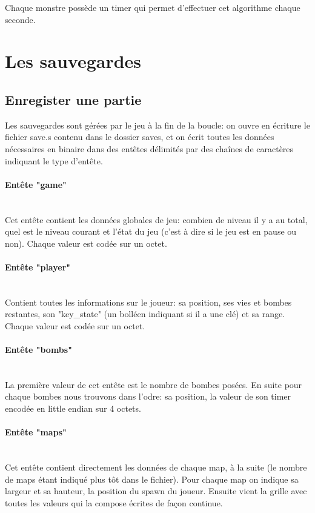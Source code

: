 \documentclass[12pt,a4paper]{article} %
\begin{document}
Chaque monstre possède un timer qui permet d'effectuer cet algorithme chaque seconde.

\section{Les sauvegardes}


\subsection{Enregister une partie}

Les sauvegardes sont gérées par le jeu à la fin de la boucle: on ouvre en écriture le fichier save.s contenu dans le dossier saves, et 
on écrit toutes les données nécessaires en binaire dans des entêtes délimités par des chaînes de caractères indiquant le type d'entête.

\paragraph{Entête "game"} \hspace{0pt} \\
Cet entête contient les données globales de jeu: combien de niveau il y a au total, quel est le niveau courant et l'état du jeu (c'est à dire si le jeu est en pause ou non). Chaque valeur est codée sur un octet.

\paragraph{Entête "player"} \hspace{0pt} \\
Contient toutes les informations sur le joueur: sa position, ses vies et bombes restantes, son "key\_state" (un bolléen indiquant si il a une clé) et sa range. Chaque valeur est codée sur un octet.

\paragraph{Entête "bombs"} \hspace{0pt} \\
La première valeur de cet entête est le nombre de bombes posées. En suite pour chaque bombes nous trouvons dans l'odre: sa position, la valeur de son timer encodée en little endian sur 4 octets.

\paragraph{Entête "maps"} \hspace{0pt} \\
Cet entête contient directement les données de chaque map, à la suite (le nombre de maps étant indiqué plus tôt dans le fichier). 
Pour chaque map on indique sa largeur et sa hauteur, la position du spawn du joueur. Ensuite vient la grille avec toutes les valeurs qui la compose écrites de façon continue.
\end{document}
